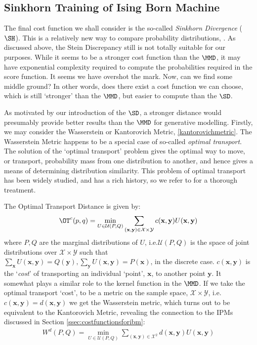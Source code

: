 

\subsection{Sinkhorn Training of Ising Born Machine \label{ssec:sinkhorntrainingofibm}}
The final cost function we shall consider is the so-called \textit{Sinkhorn Divergence} ($\SH$). This is a relatively new way to compare probability distributions, . As discussed above, the Stein Discrepancy still is not totally suitable for our purposes. While it seems to be a stronger cost function than the $\MMD$, it may have exponential complexity required to compute the probabilities required in the score function. It seems we have overshot the mark. Now, can we find some middle ground? In other words, does there exist a cost function we can choose, which is still `stronger' than the $\MMD$, but easier to compute than the $\SD$. 

As motivated by our introduction of the $\SD$, a stronger distance would presumably provide better results than the $\MMD$ for generative modelling. Firstly, we may consider the Wasserstein or Kantorovich Metric, \eqref{kantorovichmetric}. The Wasserstein Metric happens to be a special case of so-called \textit{optimal transport}. The solution of the `optimal transport' problem gives the optimal way to move, or transport, probability mass from one distribution to another, and hence gives a means of determining distribution similarity. This problem of optimal transport has been widely studied, and has a rich history, so we refer to  for a thorough treatment.

The Optimal Transport Distance is given by:
\begin{align}
\OT^c(p, q) = \min\limits_{U \in \mathcal{U}(P, Q)}\sum\limits_{(\mathbf{x}, \mathbf{y}) \in \mathcal{X}\times\mathcal{Y}} c(\mathbf{x}, \mathbf{y}) U(\mathbf{x}, \mathbf{y}) \label{otdistance}
\end{align}
where $P, Q$ are the marginal distributions of $U$, i.e.\@\@ $\mathcal{U}(P, Q)$ is the space of joint distributions over $\mathcal{X}\times\mathcal{Y}$ such that $\sum_{\mathbf{x}}U(\mathbf{x}, \mathbf{y}) = Q(\mathbf{y}), \sum_{\mathbf{y}}U(\mathbf{x}, \mathbf{y}) = P(\mathbf{x})$, in the discrete case. $c(\mathbf{x}, \mathbf{y})$ is the `\textit{cost}' of transporting an individual `point', $\mathbf{x}$, to another point $\mathbf{y}$. It somewhat plays a similar role to the kernel function in the $\MMD$. If we take the optimal transport `cost', to be a metric on the sample space, $\mathcal{X}\times \mathcal{Y}$, i.e.\@ $c(\mathbf{x}, \mathbf{y}) = d(\mathbf{x}, \mathbf{y})$ we get the Wasserstein metric, which turns out to be equivalent to  the Kantorovich Metric, revealing the connection to the IPMs discussed in Section \ref{ssec:costfunctionsforibm}:
\begin{align}
W^d(P, Q) = \min\limits_{U \in \mathcal{U}(P, Q)}\sum\limits_{(\mathbf{x}, \mathbf{y}) \in \mathcal{X}^2} d(\mathbf{x}, \mathbf{y}) U(\mathbf{x}, \mathbf{y}) \label{1wasserstein}
\end{align}

